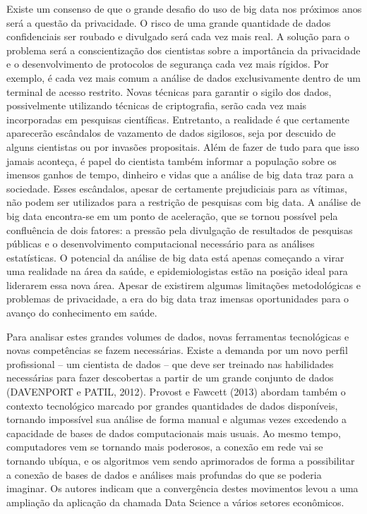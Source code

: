 Existe um consenso de que o grande desafio do uso de big data nos próximos anos será a questão da privacidade. O risco de uma grande quantidade de dados confidenciais ser roubado e divulgado será cada vez mais real. A solução para o problema será a conscientização dos cientistas sobre a importância da privacidade e o desenvolvimento de protocolos de segurança cada vez mais rígidos. Por exemplo, é cada vez mais comum a análise de dados exclusivamente dentro de um terminal de acesso restrito. Novas técnicas para garantir o sigilo dos dados, possivelmente utilizando técnicas de criptografia, serão cada vez mais incorporadas em pesquisas científicas. Entretanto, a realidade é que certamente aparecerão escândalos de vazamento de dados sigilosos, seja por descuido de alguns cientistas ou por invasões propositais. Além de fazer de tudo para que isso jamais aconteça, é papel do cientista também informar a população sobre os imensos ganhos de tempo, dinheiro e vidas que a análise de big data traz para a sociedade. Esses escândalos, apesar de certamente prejudiciais para as vítimas, não podem ser utilizados para a restrição de pesquisas com big data. A análise de big data encontra-se em um ponto de aceleração, que se tornou possível pela confluência de dois fatores: a pressão pela divulgação de resultados de pesquisas públicas e o desenvolvimento computacional necessário para as análises estatísticas. O potencial da análise de big data está apenas começando a virar uma realidade na área da saúde, e epidemiologistas estão na posição ideal para liderarem essa nova área. Apesar de existirem algumas limitações metodológicas e problemas de privacidade, a era do big data traz imensas oportunidades para o avanço do conhecimento em saúde.

Para analisar estes grandes volumes de dados, novas ferramentas tecnológicas e novas competências se fazem necessárias. Existe a demanda por um novo perfil profissional – um cientista de dados – que deve ser treinado nas habilidades necessárias para fazer descobertas a partir de um grande conjunto de dados (DAVENPORT e PATIL, 2012).  Provost e Fawcett (2013) abordam também o contexto tecnológico marcado por grandes quantidades de dados disponíveis, tornando impossível sua análise de forma manual e algumas vezes excedendo a capacidade de bases de dados computacionais mais usuais. Ao mesmo tempo, computadores vem se tornando mais poderosos, a conexão em rede vai se tornando ubíqua, e os algoritmos vem sendo aprimorados de forma a possibilitar a conexão de bases de dados e análises mais profundas do que se poderia imaginar. Os autores indicam que a convergência destes movimentos levou a uma ampliação da aplicação da chamada Data Science a vários setores econômicos.

